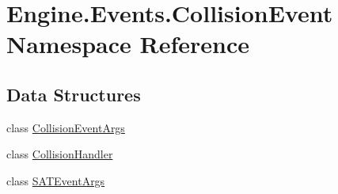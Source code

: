 \hypertarget{a00245}{}\section{Engine.\+Events.\+Collision\+Event Namespace Reference}
\label{a00245}
\subsection*{Data Structures}
\begin{DoxyCompactItemize}
\item 
class \hyperlink{a00350}{Collision\+Event\+Args}
\item 
class \hyperlink{a00354}{Collision\+Handler}
\item 
class \hyperlink{a00358}{S\+A\+T\+Event\+Args}
\end{DoxyCompactItemize}
